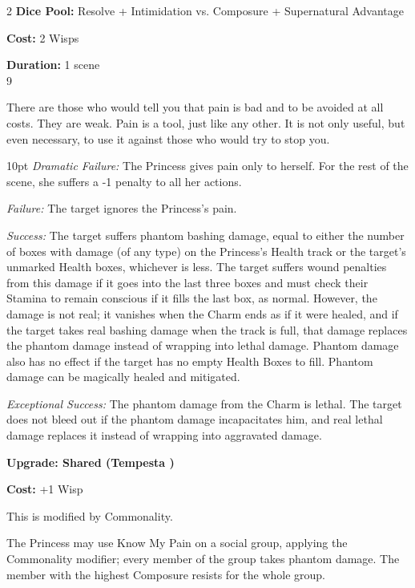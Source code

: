 \begin{multicols}{2}
\noindent \textbf{Dice Pool:} Resolve + Intimidation vs. Composure + Supernatural Advantage

\noindent \textbf{Cost:} 2 Wisps

\noindent \textbf{Duration:} 1 scene\\ 9

\noindent There are those who would tell you that pain is bad and to be avoided at all costs. They are weak. Pain is a tool, just like any other. It is not only useful, but even necessary, to use it against those who would try to stop you.

\begin{myindentpar}{10pt}    \emph{Dramatic Failure:} The Princess gives pain only to herself. For the rest of the scene, she suffers a -1 penalty to all her actions.

    \emph{Failure:} The target ignores the Princess's pain.

    \emph{Success:} The target suffers phantom bashing damage, equal to either the number of boxes with damage (of any type) on the Princess's Health track or the target's unmarked Health boxes, whichever is less. The target suffers wound penalties from this damage if it goes into the last three boxes and must check their Stamina to remain conscious if it fills the last box, as normal. However, the damage is not real; it vanishes when the Charm ends as if it were healed, and if the target takes real bashing damage when the track is full, that damage replaces the phantom damage instead of wrapping into lethal damage. Phantom damage also has no effect if the target has no empty Health Boxes to fill. Phantom damage can be magically healed and mitigated.

    \emph{Exceptional Success:} The phantom damage from the Charm is lethal. The target does not bleed out if the phantom damage incapacitates him, and real lethal damage replaces it instead of wrapping into aggravated damage. 

\textbf{Upgrade: Shared (Tempesta \textbullet\textbullet\textbullet)}

\noindent \textbf{Cost:} +1 Wisp

\noindent This is modified by Commonality. 

The Princess may use Know My Pain on a social group, applying the Commonality modifier; every member of the group takes phantom damage. The member with the highest Composure resists for the whole group.


\end{myindentpar}
\end{multicols}

